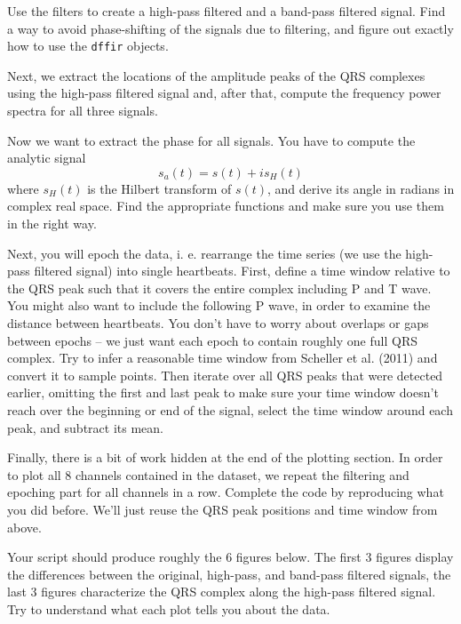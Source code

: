 \documentclass[10pt,a4paper,notitlepage]{report}
\begin{document}
Use the filters to create a high-pass filtered and a band-pass filtered signal. Find a way to avoid phase-shifting of the signals due to filtering, and figure out exactly how to use the \texttt{dffir} objects.

Next, we extract the locations of the amplitude peaks of the QRS complexes using the high-pass filtered signal and, after that, compute the frequency power spectra for all three signals.

Now we want to extract the phase for all signals. You have to compute the analytic signal
\begin{equation*}
s_a(t)=s(t)+is_H(t)
\end{equation*}
where $s_H(t)$ is the Hilbert transform of $s(t)$, and derive its angle in radians in complex real space. Find the appropriate functions and make sure you use them in the right way.

Next, you will epoch the data, i. e. rearrange the time series (we use the high-pass filtered signal) into single heartbeats. First, define a time window relative to the QRS peak such that it covers the entire complex including P and T wave. You might also want to include the following P wave, in order to examine the distance between heartbeats. You don't have to worry about overlaps or gaps between epochs – we just want each epoch to contain roughly one full QRS complex. Try to infer a reasonable time window from Scheller et al. (2011) and convert it to sample points. Then iterate over all QRS peaks that were detected earlier, omitting the first and last peak to make sure your time window doesn't reach over the beginning or end of the signal, select the time window around each peak, and subtract its mean.

Finally, there is a bit of work hidden at the end of the plotting section. In order to plot all 8 channels contained in the dataset, we repeat the filtering and epoching part for all channels in a row. Complete the code by reproducing what you did before. We'll just reuse the QRS peak positions and time window from above.

Your script should produce roughly the 6 figures below. The first 3 figures display the differences between the original, high-pass, and band-pass filtered signals, the last 3 figures characterize the QRS complex along the high-pass filtered signal. Try to understand what each plot tells you about the data.
\end{document}
